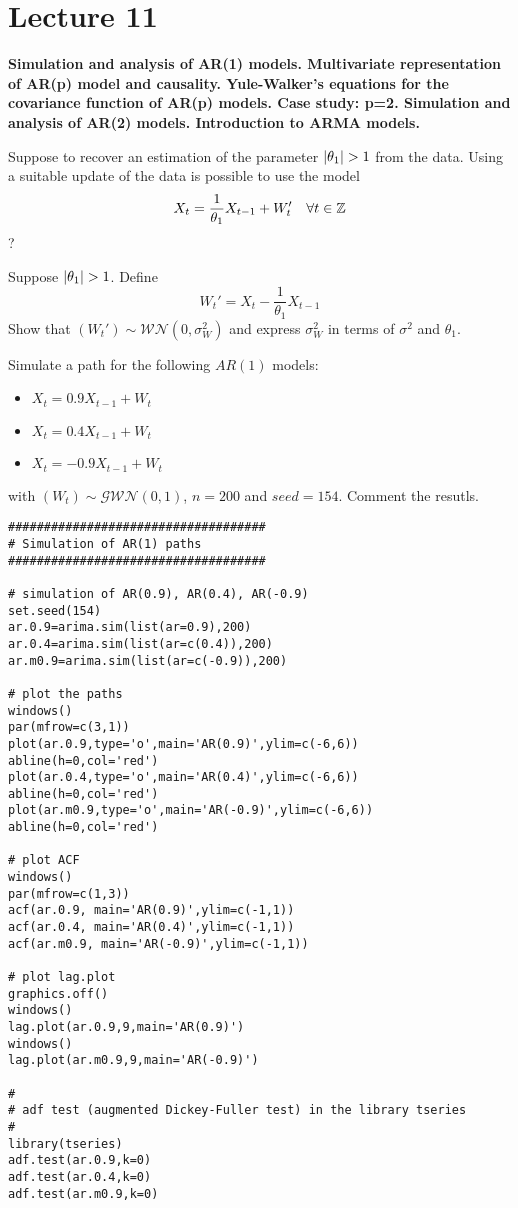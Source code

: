 \section{Lecture 11}
\label{lecture11}

\begin{center}
    \textbf{Simulation and analysis of AR(1) models. Multivariate representation of AR(p) model and causality. Yule-Walker's equations for the covariance function of AR(p) models. Case study: p=2. Simulation and analysis of AR(2) models. Introduction to ARMA models.}
\end{center}

Suppose to recover an estimation of the parameter $\abs{\theta_1}>1$ from the data. Using a suitable update of the data is possible to use the model
\[
    X_t=\frac{1}{\theta_1}X_{t-1}+W_t'\ \ \  \forall t\in\mathbb{Z}
\]
?

\begin{exercise}
    Suppose $\abs{\theta_1}>1$. Define
    \[
        W_t'=X_t-\frac{1}{\theta_1}X_{t-1}
    \]
    Show that $(W_t')\sim\mathcal{WN}(0,\sigma_W^2)$ and express $\sigma_W^2$ in terms of $\sigma^2$ and $\theta_1$.
\end{exercise}

 \begin{example}
    Simulate a path for the following $AR(1)$ models:
    \begin{itemize}
        \item $X_t=0.9X_{t-1}+W_t$
        \item $X_t=0.4X_{t-1}+W_t$
        \item $X_t=-0.9X_{t-1}+W_t$
    \end{itemize}
    with $(W_t)\sim\mathcal{GWN}(0,1)$, $n=200$ and $seed=154$. Comment the resutls.
    \begin{verbatim}
####################################
# Simulation of AR(1) paths
####################################

# simulation of AR(0.9), AR(0.4), AR(-0.9)
set.seed(154)
ar.0.9=arima.sim(list(ar=0.9),200)
ar.0.4=arima.sim(list(ar=c(0.4)),200)
ar.m0.9=arima.sim(list(ar=c(-0.9)),200)

# plot the paths
windows()
par(mfrow=c(3,1))
plot(ar.0.9,type='o',main='AR(0.9)',ylim=c(-6,6))
abline(h=0,col='red')
plot(ar.0.4,type='o',main='AR(0.4)',ylim=c(-6,6))
abline(h=0,col='red')
plot(ar.m0.9,type='o',main='AR(-0.9)',ylim=c(-6,6))
abline(h=0,col='red')

# plot ACF
windows()
par(mfrow=c(1,3))
acf(ar.0.9, main='AR(0.9)',ylim=c(-1,1))
acf(ar.0.4, main='AR(0.4)',ylim=c(-1,1))
acf(ar.m0.9, main='AR(-0.9)',ylim=c(-1,1))

# plot lag.plot
graphics.off()
windows()
lag.plot(ar.0.9,9,main='AR(0.9)')
windows()
lag.plot(ar.m0.9,9,main='AR(-0.9)')

#
# adf test (augmented Dickey-Fuller test) in the library tseries
#
library(tseries)
adf.test(ar.0.9,k=0)
adf.test(ar.0.4,k=0)
adf.test(ar.m0.9,k=0)
    \end{verbatim}
 \end{example}

